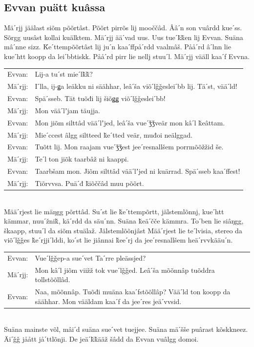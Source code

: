 \documentclass{scrbook}
\begin{document}
\subsection*{Evvan puätt kuâssa}
Mäˊrjj jäälast siõm põõrtâst. Põõrt pirrõs lij mooččâd. Ââˊn son vuârdd kueˊss. Sõrgg uusâst kollai kuälktem. Mäˊrjj ääˊvad uus. Uus tueˊǩǩen lij Evvan. Suäna mâˊnne sizz. Ǩeˊttempõõrtâst lij juˊn kaaˊffpåˊrdd vaalmâš. Pååˊrd âˊlnn lie kueˊhtt koopp da leiˊbbtiskk. Pååˊrd pirr lie nellj stuuˊl. Mäˊrjj vääll kaaˊf Evvna.\\

\begin{tabularx}{\textwidth}{l X}
Evvan:&Lij-a tuˊst mieˊlǩǩ?\\
Mäˊrjj:&Iˊlla, ij-ǥa leäkku ni säähhar, leâˊša viõˊlǧǧesleiˊbb lij. Täˊst, vääˊld!\\
Evvan:&Späˊsseb. Tät tuõđi lij šiõǥǥ viõˊlǧǧesleiˊbb!\\
Mäˊrjj:&Mon vääˊlʼjam täujja.\\
Evvan:&Mon jiõm silttâd vääˊlʼjed, leâˊša vueˊǯǯveär mon kâˊl ǩeâttam.\\
Mäˊrjj:&Mieˊccest âlgg siltteed ǩeˊtted veär, muđoi neälggad.\\
Evvan:&Tuõtt lij. Mon raajam vueˊǯǯest jeeˊresnallšem porrmõõžžid še.\\
Mäˊrjj:&Teˊl ton jiõk taarbâž ni kaappi.\\
Evvan:&Taarbšam mon. Jiõm silttâd vääˊlʼjed ni kuärrad. Späˊsseb kaaˊffest!\\
Mäˊrjj:&Tiõrvvsa. Puäˊđ ǩiõččâd muu põõrt.\\
\end{tabularx}\\

Määˊrjest lie mäŋgg põrttâd. Suˊst lie ǩeˊttempõrtt, jälstemlõnnj, kueˊhtt kämmar, nuuˊžniǩ, käˊrdd da säuˊnn. Suäna ǩeäˊčče kämmra. Toˊben lie siâŋgg, škaapp, stuuˊl da siõm stuälaž. Jälstemlõõnjâst Määˊrjest lie teˊlvisia, stereo da viõˊlǧǧes ǩeˊrjjiˊlddi, koˊst lie jiânnai ǩeeˊrj da jeeˊresnallšem heäˊrvvkääuˊn.\\

\begin{tabularx}{\textwidth}{l X}
Evvan:&Vueˊlǧǧep-a sueˊvet Taˊrre pleässjed?\\
Mäˊrjj:&Mon kâˊl jiõm viižž tok vueˊlǧǧed. Leâˊša mõõnnâp tuõddra tollstõõllâd.\\
Evvan:&Naa, mõõnnâp. Tuõđi muäna kaaˊfstõõllâp? Vääˊld ton koopp da säähhar. Mon vääldam kaaˊf da jeeˊres jeäˊvvsid.\\
\end{tabularx}\\

Suäna mainste võl, mâiˊd suäna sueˊvet tuejjee. Suäna mäˊšše puârast kõskkneez. Äiˊǧǧ jåått jåˊttlõnji. De jeäˊǩǩääž šâdd da Evvan vuâlgg domoi.
\end{document}
